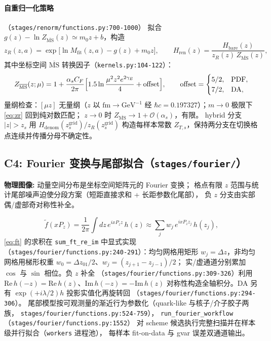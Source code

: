 \documentclass[UTF8]{ctexart}
\begin{document}
\paragraph{自重归一化策略}（\texttt{\nolinkurl{stages/renorm/functions.py:700-1000}}）
拟合 $g(z)-\ln Z_{\overline{\mathrm{MS}}}(z)\simeq m_0z+b$，构造
\begin{equation}\label{eq:zr}
z_R(z,a)=\exp\bigl[\ln M_{\mathrm{fit}}(z,a)-g(z)+m_0z\bigr],\qquad
H_{\mathrm{ren}}(z)=\frac{H_{\mathrm{bare}}(z)}{z_R(z)\,Z_{\overline{\mathrm{MS}}}(z)},
\end{equation}
其中坐标空间 $\overline{\mathrm{MS}}$ 转换因子（\texttt{\nolinkurl{kernels.py:104-122}}）：
\begin{equation}\label{eq:zmsbar}
Z_{\overline{\mathrm{MS}}}(z;\mu)=1+\frac{\alpha_s C_F}{2\pi}\Bigl[
1.5\ln\frac{\mu^2 z^2 e^{2\gamma_E}}{4}+\mathrm{offset}\Bigr],\qquad
\mathrm{offset}=\begin{cases}5/2,&\text{PDF},\\7/2,&\text{DA},\end{cases}
\end{equation}
量纲检查：$[\mu z]$ 无量纲（$z$ 以 $\mathrm{fm}\to\mathrm{GeV}^{-1}$ 经
$\hbar c=0.197327$）；$m\to0$ 极限下 \eqref{eq:zr} 回到纯对数匹配；
$z\to0$ 时 $Z_{\overline{\mathrm{MS}}}\to 1+\mathcal O(\alpha_s)$，有限。
hybrid 分支 $|z|>z_s$ 用 $H_{\mathrm{denom}}(z_s^{\mathrm{grid}})/z_R(z_s^{\mathrm{grid}})$
构造每样本常数 $Z_{T,s}$，保持两分支在切换格点连续并传播分母不确定性。

\subsection{C4: Fourier 变换与尾部拟合（\texttt{stages/fourier/}）}

\begin{physbox}
\textbf{物理图像:} 动量空间分布是坐标空间矩阵元的 Fourier 变换；
格点有限 $z$ 范围与统计尾部噪声迫使分段方案（短距直接求和 + 长距参数化尾部），
负 $z$ 分支由实部偶/虚部奇对称性补全。
\end{physbox}
\begin{equation}\label{eq:ft}
\tilde f(xP_z)=\frac{1}{2\pi}\int dz\,e^{ixP_z z}\,h(z)\approx
\sum_j w_j\,e^{ixP_z z_j}\,h(z_j),
\end{equation}
\eqref{eq:ft} 的求积在 \texttt{sum\_ft\_re\_im} 中显式实现
（\texttt{\nolinkurl{stages/fourier/functions.py:240-291}}）：均匀网格用矩形
$w_j=\Delta z$，非均匀网格用梯形权重 $w_0=\Delta z_{01}/2$、$w_j=(z_{j+1}-z_{j-1})/2$；
实/虚通道分别累加 $\cos$ 与 $\sin$ 相位。负 $z$ 补全
（\texttt{\nolinkurl{stages/fourier/functions.py:309-326}}）利用
$\mathrm{Re}\,h(-z)=\mathrm{Re}\,h(z)$、$\mathrm{Im}\,h(-z)=-\mathrm{Im}\,h(z)$
对称性构造全轴积分。DA 另有 $\exp(+i\lambda/2)h$ 投影实值化再旋转回
（\texttt{\nolinkurl{stages/fourier/functions.py:294-306}}）。
尾部模型按可观测量的渐近行为参数化（quark-like 与核子/介子胶子两族，
\texttt{\nolinkurl{stages/fourier/functions.py:524-759}}），
\texttt{run\_fourier\_workflow}（\texttt{\nolinkurl{stages/fourier/functions.py:1552}}）
对 scheme 候选执行完整扫描并在样本级并行拟合（\texttt{workers} 进程池），
每样本 fit-on-data 与 gvar 误差双通道输出。
\end{document}

